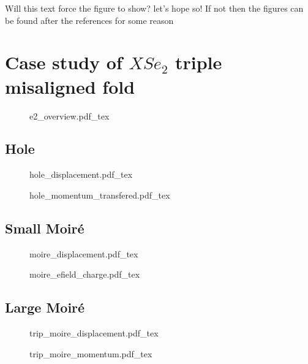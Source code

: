 Will this text force the figure to show? let's hope so!
If not then the figures can be found after the references for some reason
\newpage


\section{Case study of $XSe_2$ triple misaligned fold}
\begin{figure}[t]
    \centering
    \def\svgwidth{.95\linewidth}
    {e2_overview.pdf_tex}
    \caption{}
    \label{fig:strain_overview}
\end{figure}


\subsection{Hole}

\begin{figure}[t]
    \centering
    \def\svgwidth{.95\linewidth}
    {hole_displacement.pdf_tex}
    \caption{}
    \label{fig:strain_overview}
\end{figure}


\begin{figure}[t]
    \centering
    \def\svgwidth{.7\linewidth}
    {hole_momentum_transfered.pdf_tex}
    \caption{}
    \label{fig:strain_overview}
\end{figure}

\subsection{Small Moiré}

\begin{figure}[t]
    \centering
    \def\svgwidth{.95\linewidth}
    {moire_displacement.pdf_tex}
    \caption{}
    \label{fig:strain_overview}
\end{figure}


\begin{figure}[t]
    \centering
    \def\svgwidth{.5\linewidth}
    {moire_efield_charge.pdf_tex}
    \caption{}
    \label{fig:strain_overview}
\end{figure}

\subsection{Large Moiré}
\begin{figure}[t]
    \centering
    \def\svgwidth{.95\linewidth}
    {trip_moire_displacement.pdf_tex}
    \caption{}
    \label{fig:strain_overview}
\end{figure}


\begin{figure}[t]
    \centering
    \def\svgwidth{.7\linewidth}
    {trip_moire_momentum.pdf_tex}
    \caption{}
    \label{fig:strain_overview}
\end{figure}
